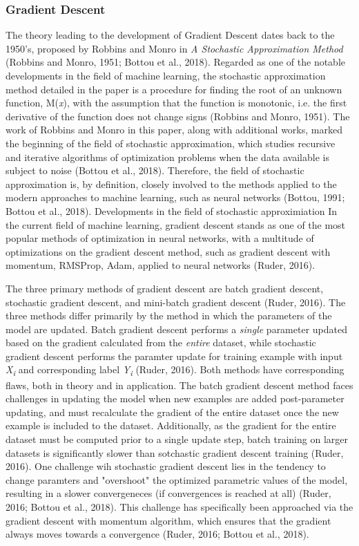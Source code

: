 \documentclass[11pt]{article}
\begin{document}
\subsubsection{Gradient Descent}
The theory leading to the development of Gradient Descent dates back to the 1950's, proposed by Robbins and Monro in \textit{A Stochastic Approximation Method} (Robbins and Monro, 1951; Bottou et al., 2018). Regarded as one of the notable developments in the field of machine learning, the stochastic approximation method detailed in the paper is a procedure for finding the root of an unknown function, M(\textit{x}), with the assumption that the function is monotonic, i.e. the first derivative of the function does not change signs (Robbins and Monro, 1951). The work of Robbins and Monro in this paper, along with additional works, marked the beginning of the field of stochastic approximation, which studies recursive and iterative algorithms of optimization problems when the data available is subject to noise (Bottou et al., 2018). Therefore, the field of stochastic approximation is, by definition, closely involved to the methods applied to the modern approaches to machine learning, such as neural networks (Bottou, 1991; Bottou et al., 2018). Developments in the field of stochastic approximiation  In the current field of machine learning, gradient descent stands as one of the most popular methods of optimization in neural networks, with a multitude of optimizations on the gradient descent method, such as gradient descent with momentum, RMSProp, Adam, applied to neural networks (Ruder, 2016).\par

The three primary methods of gradient descent are batch gradient descent, stochastic gradient descent, and mini-batch gradient descent (Ruder, 2016). The three methods differ primarily by the method in which the parameters of the model are updated. Batch gradient descent performs a \textit{single} parameter updated based on the gradient calculated from the \textit{entire} dataset, while stochastic gradient descent performs the paramter update for training example with input \textit{X\textsubscript{i}} and corresponding label \textit{Y\textsubscript{i}} (Ruder, 2016). Both methods have corresponding flaws, both in theory and in application. The batch gradient descent method faces challenges in updating the model when new examples are added post-parameter updating, and must recalculate the gradient of the entire dataset once the new example is included to the dataset. Additionally, as the gradient for the entire dataset must be computed prior to a single update step, batch training on larger datasets is significantly slower than sotchastic gradient descent training (Ruder, 2016). One challenge wih stochastic gradient descent lies in the tendency to change paramters and "overshoot" the optimized parametric values of the model, resulting in a slower convergeneces (if convergences is reached at all) (Ruder, 2016; Bottou et al., 2018). This challenge has specifically been approached via the gradient descent with momentum algorithm, which ensures that the gradient always moves towards a convergence (Ruder, 2016; Bottou et al., 2018).\par
\end{document}
